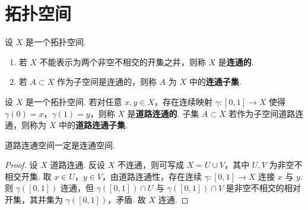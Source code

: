 \documentclass[../../main.tex]{subfiles}%
\begin{document}
\section{拓扑空间}

\begin{definition}
设 $X$ 是一个拓扑空间.
\begin{enumerate}[(1)]
\item 若 $X$ 不能表示为两个非空不相交的开集之并，则称 $X$ 是\textbf{连通的}.
\item 若 $A\subset X$ 作为子空间是连通的，则称 $A$ 为 $X$ 中的\textbf{连通子集}.
\end{enumerate}
\end{definition}

\begin{definition}
设 $X$ 是一个拓扑空间. 若对任意 $x,y\in X$，存在连续映射 $\gamma:[0,1]\to X$ 使得 $\gamma(0)=x$，$\gamma(1)=y$，则称 $X$ 是\textbf{道路连通的}. 子集 $A\subset X$ 若作为子空间道路连通，则称为 $X$ 中的\textbf{道路连通子集}.
\end{definition}

\begin{proposition}\label{proposition:道路连通空间一定是连通空间}
道路连通空间一定是连通空间.
\end{proposition}
\begin{proof}
设 $X$ 道路连通. 反设 $X$ 不连通，则可写成 $X=U\cup V$，其中 $U,V$ 为非空不相交开集. 取 $x\in U$，$y\in V$，由道路连通性，存在连续 $\gamma:[0,1]\to X$ 连接 $x$ 与 $y$. 则 $\gamma([0,1])$ 连通，但 $\gamma([0,1])\cap U$ 与 $\gamma([0,1])\cap V$ 是非空不相交的相对开集，其并集为 $\gamma([0,1])$，矛盾. 故 $X$ 连通.
\end{proof}
\end{document}

